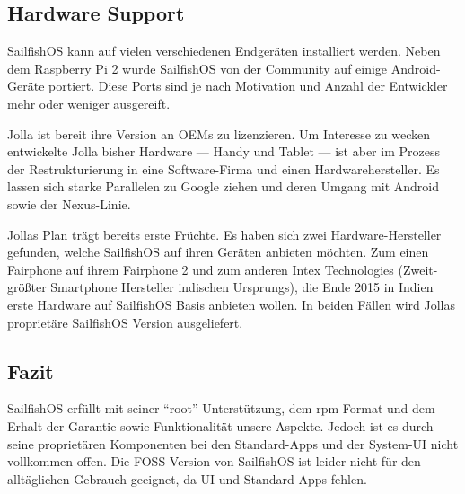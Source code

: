 \subsection{Hardware Support}
\mbox{SailfishOS} kann auf vielen verschiedenen Endgeräten installiert werden. Neben dem Raspberry Pi 2\thinspace\cite{online:sailfish-rpi2} wurde \mbox{SailfishOS} von der Community\thinspace\cite{online:sailfish-android-port} auf einige Android-Geräte portiert. Diese Ports sind je nach Motivation und Anzahl der Entwickler mehr oder weniger ausgereift\thinspace\cite{online:sailfish-porters}.

Jolla ist bereit ihre Version an OEMs zu lizenzieren. Um Interesse zu wecken entwickelte Jolla bisher Hardware --- Handy\thinspace\cite{online:jolla-smartphone} und Tablet\thinspace\cite{online:jolla-tablet} --- ist aber im Prozess der Restrukturierung in eine Software-Firma und einen Hardwarehersteller\thinspace\cite{online:jolla-googlelike}. Es lassen sich starke Parallelen zu Google ziehen und deren Umgang mit Android sowie der Nexus-Linie.

Jollas Plan trägt bereits erste Früchte. Es haben sich zwei Hardware-Hersteller gefunden, welche \mbox{SailfishOS} auf ihren Geräten anbieten möchten. Zum einen Fairphone auf ihrem Fairphone 2\thinspace\cite{online:jolla-fairphone2} und zum anderen Intex Technologies (Zweit-größter Smartphone Hersteller indischen Ursprungs), die Ende 2015 in Indien erste Hardware auf \mbox{SailfishOS} Basis anbieten wollen\thinspace\cite{online:jolla-intex-pdf}. In beiden Fällen wird Jollas proprietäre \mbox{SailfishOS} Version ausgeliefert.
\newline

\subsection{Fazit}
\mbox{SailfishOS} erfüllt mit seiner \mbox{``root''-Unterstützung}, dem \mbox{rpm-Format} und dem Erhalt der Garantie sowie Funktionalität unsere Aspekte. Jedoch ist es durch seine proprietären Komponenten bei den \mbox{Standard-Apps} und der \mbox{System-UI} nicht vollkommen offen. Die \mbox{FOSS-Version} von \mbox{SailfishOS} ist leider nicht für den alltäglichen Gebrauch geeignet, da UI und \mbox{Standard-Apps} fehlen.